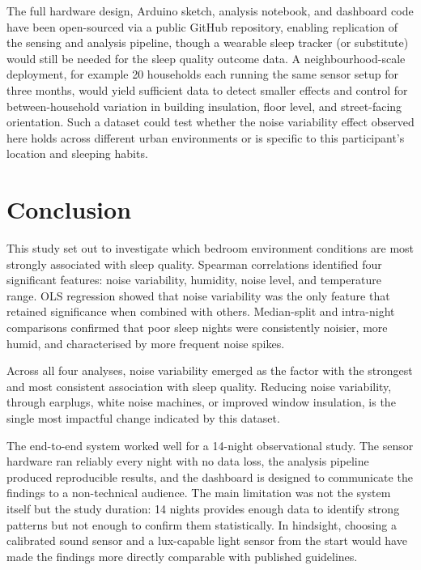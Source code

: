 \documentclass[10pt,a4paper]{extarticle}
\begin{document}
The full hardware design, Arduino sketch, analysis notebook, and dashboard code have been open-sourced via a public GitHub repository, enabling replication of the sensing and analysis pipeline, though a wearable sleep tracker (or substitute) would still be needed for the sleep quality outcome data. A neighbourhood-scale deployment, for example 20 households each running the same sensor setup for three months, would yield sufficient data to detect smaller effects and control for between-household variation in building insulation, floor level, and street-facing orientation. Such a dataset could test whether the noise variability effect observed here holds across different urban environments or is specific to this participant's location and sleeping habits.

\section*{Conclusion}

This study set out to investigate which bedroom environment conditions are most strongly associated with sleep quality. Spearman correlations identified four significant features: noise variability, humidity, noise level, and temperature range. OLS regression showed that noise variability was the only feature that retained significance when combined with others. Median-split and intra-night comparisons confirmed that poor sleep nights were consistently noisier, more humid, and characterised by more frequent noise spikes.

Across all four analyses, noise variability emerged as the factor with the strongest and most consistent association with sleep quality. Reducing noise variability, through earplugs, white noise machines, or improved window insulation, is the single most impactful change indicated by this dataset.

The end-to-end system worked well for a 14-night observational study. The sensor hardware ran reliably every night with no data loss, the analysis pipeline produced reproducible results, and the dashboard is designed to communicate the findings to a non-technical audience. The main limitation was not the system itself but the study duration: 14 nights provides enough data to identify strong patterns but not enough to confirm them statistically. In hindsight, choosing a calibrated sound sensor and a lux-capable light sensor from the start would have made the findings more directly comparable with published guidelines.
\end{document}
